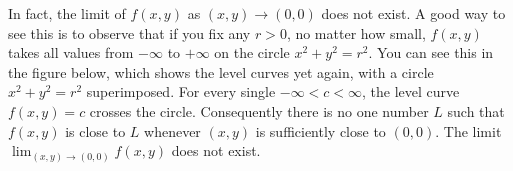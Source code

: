 \begin{eg}
In fact, the limit of $f(x,y)$ as $(x,y)\rightarrow (0,0)$ does not exist. 
A good way to see this is to observe that if you fix any $r>0$, 
no matter how small, $f(x,y)$
takes all values from $-\infty$ to $+\infty$ on the circle $x^2+y^2=r^2$.
You can see this in the figure below, which shows the level 
curves yet again, with a circle $x^2+y^2=r^2$ superimposed. 
For every single $-\infty < c <\infty$, the level curve $f(x,y)=c$ crosses
the circle.
Consequently there is no one number $L$ such that $f(x,y)$ is close to $L$
whenever $(x,y)$ is sufficiently close to $(0,0)$. The limit 
$\lim_{(x,y)\rightarrow(0,0)} f(x,y)$ does not exist.



\end{eg}
